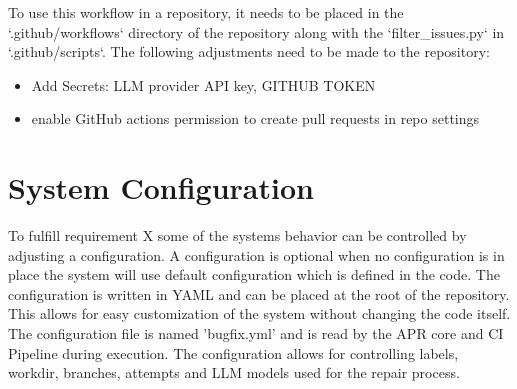 To use this workflow in a repository, it needs to be placed in the `.github/workflows` directory of the repository along with the `filter\_issues.py` in `.github/scripts`.
The following adjustments need to be made to the repository:
\begin{itemize}
    \item Add Secrets: LLM provider API key, GITHUB TOKEN
    \item enable GitHub actions permission to create pull requests in repo settings
\end{itemize}


\section{System Configuration}

To fulfill requirement X some of the systems behavior can be controlled by adjusting a configuration. A configuration is optional when no configuration is in place the system will use default configuration which is defined in the code. The configuration is written in YAML and can be placed at the root of the repository. This allows for easy customization of the system without changing the code itself. The configuration file is named 'bugfix.yml' and is read by the APR core and CI Pipeline during execution. The configuration allows for controlling labels, workdir, branches, attempts and LLM models used for the repair process.

